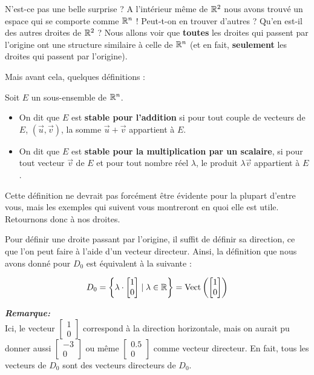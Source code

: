 N'est-ce pas une belle surprise ? A l'intérieur même de $\mathbb{R}^2$ nous avons trouvé un espace qui se comporte comme $\mathbb{R}^n$ ! Peut-t-on en trouver d'autres ? Qu'en est-il des autres droites de $\mathbb{R}^2$ ? Nous allons voir que \textbf{toutes} les droites qui passent par l'origine ont une structure similaire à celle de $\mathbb{R}^n$ (et en fait, \textbf{seulement} les droites qui passent par l'origine).

Mais avant cela, quelques définitions :

\begin{boxdef} 
    Soit $E$ un sous-ensemble de $\mathbb{R}^n$.
 \begin{itemize}
     \item On dit que $E$ est \textbf{stable pour l'addition} si pour tout couple de vecteurs de $E$, $(\vec{u}, \vec{v})$, la somme $\vec{u} + \vec{v}$ appartient à $E$.
     \item On dit que $E$ est \textbf{stable pour la multiplication par un scalaire}, si pour tout vecteur $\vec{v}$ de $E$ et pour tout nombre réel $\lambda$, le produit $\lambda \vec{v}$ appartient à $E$.
 \end{itemize}
\end{boxdef}

Cette définition ne devrait pas forcément être évidente pour la plupart d'entre vous, mais les exemples qui suivent vous montreront en quoi elle est utile. Retournons donc à nos droites.

Pour définir une droite passant par l'origine, il suffit de définir sa direction, ce que l'on peut faire à l'aide d'un vecteur directeur. Ainsi, la définition que nous avons donné pour $D_0$ est équivalent à la suivante :

\[
D_0 = \left\{\lambda \cdot \begin{bmatrix} 1\\0\end{bmatrix} \mid \lambda \in \mathbb{R}\right\} = \operatorname{Vect}\left(\begin{bmatrix}1\\0\end{bmatrix}\right)
\]

\textit{\textbf{Remarque:}}\\
Ici, le vecteur $\begin{bmatrix} 1\\0\end{bmatrix}$ correspond à la direction horizontale, mais on aurait pu donner aussi $\begin{bmatrix} -3\\0\end{bmatrix}$ ou même $\begin{bmatrix} 0.5\\0\end{bmatrix}$ comme vecteur directeur. En fait, tous les vecteurs de $D_0$ sont des vecteurs directeurs de $D_0$.

